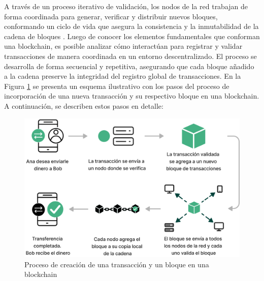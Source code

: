 A través de un proceso iterativo de validación, los \glspl{nodo} de la red trabajan de forma coordinada para generar, verificar y distribuir nuevos bloques, conformando un ciclo de vida que asegura la consistencia y la inmutabilidad de la cadena de bloques \cite{bartolomeo2020introduccion}. Luego de conocer los elementos fundamentales que conforman una blockchain, es posible analizar cómo interactúan para registrar y validar transacciones de manera coordinada en un entorno descentralizado. El proceso se desarrolla de forma secuencial y repetitiva, asegurando que cada bloque añadido a la cadena preserve la integridad del registro global de transacciones. En la Figura \ref{fig:blockchain-working} se presenta un esquema ilustrativo con los pasos del proceso de incorporación de una nueva transacción y su respectivo bloque en una blockchain. A continuación, se describen estos pasos en detalle:

\begin{figure}[!tb]
    \centering
    \includegraphics[width=\textwidth]{Figures/block-creation.png}
    \caption{Proceso de creación de una transacción y un bloque en una blockchain}
    \label{fig:blockchain-working}
\end{figure}

